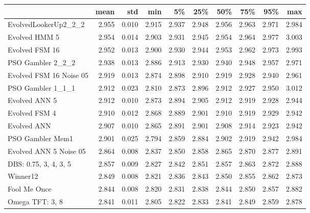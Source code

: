 \begin{tabular}{lrrrrrrrrr}
\toprule
{} &   mean &    std &    min &     5\% &    25\% &    50\% &    75\% &    95\% &    max \\
\midrule
EvolvedLookerUp2\_2\_2    &  2.955 &  0.010 &  2.915 &  2.937 &  2.948 &  2.956 &  2.963 &  2.971 &  2.984 \\
Evolved HMM 5           &  2.954 &  0.014 &  2.903 &  2.931 &  2.945 &  2.954 &  2.964 &  2.977 &  3.003 \\
Evolved FSM 16          &  2.952 &  0.013 &  2.900 &  2.930 &  2.944 &  2.953 &  2.962 &  2.973 &  2.993 \\
PSO Gambler 2\_2\_2       &  2.938 &  0.013 &  2.886 &  2.913 &  2.930 &  2.940 &  2.948 &  2.957 &  2.971 \\
Evolved FSM 16 Noise 05 &  2.919 &  0.013 &  2.874 &  2.898 &  2.910 &  2.919 &  2.928 &  2.940 &  2.961 \\
PSO Gambler 1\_1\_1       &  2.912 &  0.023 &  2.810 &  2.873 &  2.896 &  2.912 &  2.927 &  2.950 &  3.012 \\
Evolved ANN 5           &  2.912 &  0.010 &  2.873 &  2.894 &  2.905 &  2.912 &  2.919 &  2.928 &  2.944 \\
Evolved FSM 4           &  2.910 &  0.012 &  2.868 &  2.889 &  2.901 &  2.910 &  2.919 &  2.929 &  2.942 \\
Evolved ANN             &  2.907 &  0.010 &  2.865 &  2.891 &  2.901 &  2.908 &  2.914 &  2.923 &  2.942 \\
PSO Gambler Mem1        &  2.901 &  0.025 &  2.794 &  2.859 &  2.884 &  2.902 &  2.919 &  2.942 &  2.984 \\
Evolved ANN 5 Noise 05  &  2.864 &  0.008 &  2.837 &  2.850 &  2.858 &  2.865 &  2.870 &  2.877 &  2.891 \\
DBS: 0.75, 3, 4, 3, 5   &  2.857 &  0.009 &  2.827 &  2.842 &  2.851 &  2.857 &  2.863 &  2.872 &  2.888 \\
Winner12                &  2.849 &  0.008 &  2.821 &  2.836 &  2.843 &  2.850 &  2.855 &  2.862 &  2.873 \\
Fool Me Once            &  2.844 &  0.008 &  2.820 &  2.831 &  2.838 &  2.844 &  2.850 &  2.857 &  2.882 \\
Omega TFT: 3, 8         &  2.841 &  0.011 &  2.805 &  2.822 &  2.833 &  2.841 &  2.849 &  2.859 &  2.878 \\
\bottomrule
\end{tabular}
